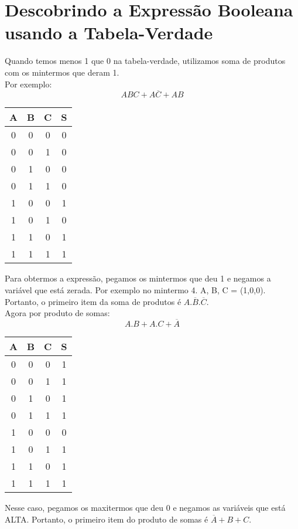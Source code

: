 \documentclass{article}
\begin{document}
	\section{Descobrindo a Expressão Booleana usando a Tabela-Verdade}
		Quando temos menos 1 que 0 na tabela-verdade, utilizamos soma de produtos com os mintermos que deram 1.\\
		Por exemplo:\\
		$$ABC+A\overline{C}+AB$$
		\begin{tabular}{|c|c|c|c|}
				\hline
				A & B & C & S \\
				\hline
				0 & 0 & 0 & 0 \\
				\hline
				0 & 0 & 1 & 0 \\
				\hline
				0 & 1 & 0 & 0 \\
				\hline
				0 & 1 & 1 & 0 \\
				\hline
				1 & 0 & 0 & 1 \\
				\hline
				1 & 0 & 1 & 0 \\
				\hline
				1 & 1 & 0 & 1 \\
				\hline
				1 & 1 & 1 & 1 \\
				\hline
		\end{tabular}
		
		Para obtermos a expressão, pegamos os mintermos que deu 1 e negamos a variável que está zerada. Por exemplo no mintermo 4. A, B, C = (1,0,0). Portanto, o primeiro item da soma de produtos é $A.\overline{B}.\overline{C}$.\\
		
		Agora por produto de somas:\\
		$$A.B+A.C+\overline{A}$$
		\begin{tabular}{|c|c|c|c|}
				\hline
				A & B & C & S \\
				\hline
				0 & 0 & 0 & 1 \\
				\hline
				0 & 0 & 1 & 1 \\
				\hline
				0 & 1 & 0 & 1 \\
				\hline
				0 & 1 & 1 & 1 \\
				\hline
				1 & 0 & 0 & 0 \\
				\hline
				1 & 0 & 1 & 1 \\
				\hline
				1 & 1 & 0 & 1 \\
				\hline
				1 & 1 & 1 & 1 \\
				\hline
		\end{tabular}
		Nesse caso, pegamos os maxitermos que deu 0 e negamos as variáveis que está ALTA. Portanto, o primeiro item do produto de somas é $\overline{A}+B+C$.\\
\end{document}
